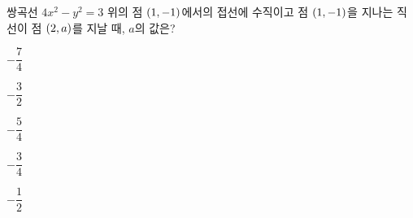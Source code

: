 쌍곡선 $4x^2-y^2=3$ 위의 점 $(1{,}\mkern3mu\mathopen{}-1)$에서의 접선에 수직이고 점 $(1{,}\mkern3mu\mathopen{}-1)$을 지나는 직선이 점 $(2{,}\mkern3mu\mathopen{}a)$를 지날 때, $a$의 값은?
\begin{choices32}{\rule[-3ex]{0pt}{8ex}$-\dfrac{7}{4}$}{\rule[-3ex]{0pt}{8ex}$-\dfrac{3}{2}$}{\rule[-3ex]{0pt}{8ex}$-\dfrac{5}{4}$}{\rule[-3ex]{0pt}{8ex}$-\dfrac{3}{4}$}{\rule[-3ex]{0pt}{8ex}$-\dfrac{1}{2}$}\end{choices32}

